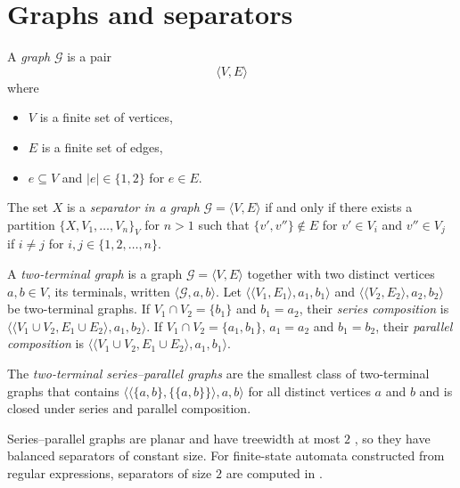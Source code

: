 \section{Graphs and separators}

\begin{definition}
  A \emph{graph} $\mathcal{G}$ is a pair
  \begin{equation*}
    \langle V, E \rangle
  \end{equation*}
  where
  \begin{itemize}
    \item $V$ is a finite set of vertices,
    \item $E$ is a finite set of edges,
    \item $e \subseteq V$ and $|e| \in \{ 1, 2 \}$ for $e \in E$.
  \end{itemize}
\end{definition}

\begin{definition}
  The set $X$ is a \emph{separator in a graph} $\mathcal{G} = \langle V, E \rangle$
  if and only if there exists a partition ${\{ X, V_1, \ldots, V_n \}}_V$ for $n > 1$
  such that $\{ v', v'' \} \not\in E$ for $v' \in V_i$ and $v'' \in V_j$ if $i
  \neq j$ for $i, j \in \{1, 2, \ldots, n \}$.
\end{definition}

A \emph{two-terminal graph} is a graph $\mathcal{G} = \langle V, E \rangle$ together with
two distinct vertices $a, b \in V$, its terminals, written $\langle \mathcal{G}, a, b
\rangle$. Let $\langle \langle V_1, E_1 \rangle, a_1, b_1 \rangle$ and $\langle \langle V_2,
E_2 \rangle, a_2, b_2 \rangle$ be two-terminal graphs. If $V_1 \cap V_2 = \{ b_1 \}$ and
$b_1 = a_2$, their \emph{series composition} is $\langle \langle V_1 \cup V_2, E_1 \cup E_2
\rangle, a_1, b_2 \rangle$. If $V_1 \cap V_2 = \{ a_1, b_1 \}$, $a_1 = a_2$ and $b_1 =
b_2$, their \emph{parallel composition} is $\langle \langle V_1 \cup V_2, E_1 \cup E_2
\rangle, a_1, b_1 \rangle$.

\begin{definition}\label{def:series_parallel}
  The \emph{two-terminal series--parallel graphs} are the smallest class of two-terminal
  graphs that contains $\langle \langle \{ a, b \}, \{ \{ a, b \} \} \rangle, a, b
  \rangle$ for all distinct vertices $a$ and $b$ and is closed under series and parallel
  composition.
\end{definition}

Series--parallel graphs are planar and have treewidth at most $2$
\cite{bodlaender_arboretum}, so they have balanced separators of constant size. For
finite-state automata constructed from regular expressions, separators of size $2$ are
computed in .
